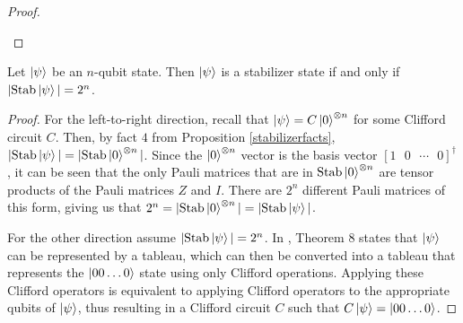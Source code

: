 \documentclass[12pt]{dalthesis}
\begin{document}
\begin{proof}
\begin{enumerate}
 \qedhere
\end{enumerate}
\end{proof}

\begin{theorem}
\label{stabstate}
Let $\ket{\psi}$ be an $n$-qubit state. Then $\ket{\psi}$ is a stabilizer state if and only if $|\mathrm{Stab} \ket{\psi}| = 2^n$. 
\end{theorem}
\begin{proof}
For the left-to-right direction, recall that $\ket{\psi} = C\ket{0}^{\otimes n}$ for some Clifford circuit $C$. Then, by fact $4$ from Proposition \ref{stabilizerfacts}, $|\mathrm{Stab} \ket{\psi}| = |\mathrm{Stab} \ket{0}^{\otimes n}|$. Since the $\ket{0}^{\otimes n}$ vector is the basis vector $[1 \mbox{ } 0 \mbox{ } \cdots \mbox{ } 0]^\dagger$, it can be seen that the only Pauli matrices that are in $\mathrm{Stab} \ket{0}^{\otimes n}$ are tensor products of the Pauli matrices $Z$ and $I$. There are $2^n$ different Pauli matrices of this form, giving us that $2^n = |\mathrm{Stab} \ket{0}^{\otimes n}| = |\mathrm{Stab} \ket{\psi}|$.

For the other direction assume $|\mathrm{Stab} \ket{\psi}| = 2^n$. In \cite{Aaronson_2004}, Theorem 8 states that $\ket{\psi}$ can be represented by a tableau, which can then be converted into a tableau that represents the $\ket{00 \dots 0}$ state using only Clifford operations. Applying these Clifford operators is equivalent to applying Clifford operators to the appropriate qubits of $\ket{\psi}$, thus resulting in a Clifford circuit $C$ such that $C\ket{\psi} = \ket{00 \dots 0}$.  \qedhere


\end{proof}
\end{document}
